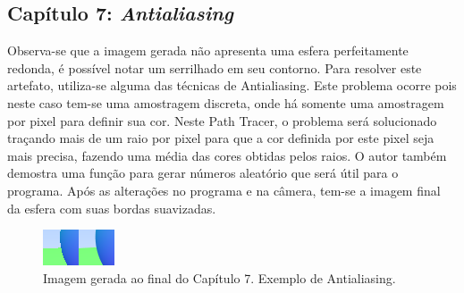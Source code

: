 \documentclass[journal]{IEEEtran}
\begin{document}
\subsection*{Capítulo 7: \emph{Antialiasing}}
Observa-se que a imagem gerada não apresenta uma esfera perfeitamente redonda, é possível notar um serrilhado
em seu contorno. Para resolver este artefato, utiliza-se alguma das técnicas de Antialiasing. Este problema
ocorre pois neste caso tem-se uma amostragem discreta, onde há somente uma amostragem por pixel para definir
sua cor. Neste Path Tracer, o problema será solucionado traçando mais de um raio por pixel para que a cor
definida por este pixel seja mais precisa, fazendo uma média das cores obtidas pelos raios. O autor também
demostra uma função para gerar números aleatório que será útil para o programa. Após as alterações no programa
e na câmera, tem-se a imagem final da esfera com suas bordas suavizadas.

\begin{figure}[ht]
  \centering
  \includegraphics[width=\linewidth]{media/img-1.06-antialias-before-after.png}
  \caption{Imagem gerada ao final do Capítulo 7. Exemplo de Antialiasing.}
  \label{img_aa}
\end{figure}
\end{document}
